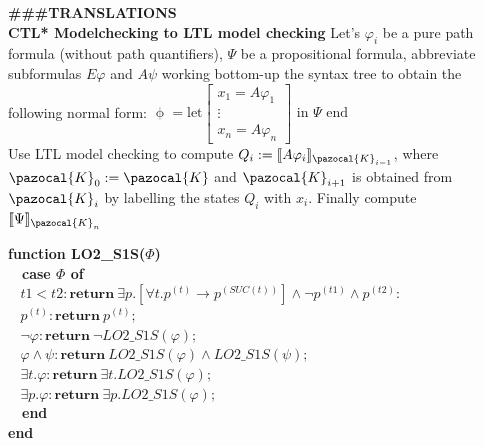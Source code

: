 \documentclass{article}
\newcommand{\Kb}{\pazocal{K}}
\begin{document}
\begin{multicols}{4}

\textbf{\#\#\#TRANSLATIONS} \\

\textbf{CTL* Modelchecking to LTL model checking}
Let's $\varphi_i$ be a pure path formula (without path quantifiers), $\Psi$ be a propositional formula, abbreviate subformulas $E\varphi$ and $A\psi$ working bottom-up the syntax tree to obtain the following normal form:
$\upphi = \text{let} \begin{bmatrix}
x_1 = A\varphi_1\\
\vdots \\
x_n = A\varphi_n
\end{bmatrix}
\text{ in } \Psi \text{ end}$\\
Use LTL model checking to compute $Q_i:=\llbracket A\varphi_i\rrbracket _{\Kb_{i-1}}$, where $\Kb_0 := \Kb$ and $\Kb_{i+1}$ is obtained from $\Kb_i$ by labelling the states $Q_i$ with $x_i$.
Finally compute $\llbracket \Psi \rrbracket_{\Kb_n}$

\textbf{function LO2\_S1S($\Phi$)} \\
\ \ \textbf{case $\Phi$ of} \\
$\ \ \ \ t1 < t2 : \textbf{return}\ \exists p. [\forall t. p^{(t)} \rightarrow p^{(SUC(t))} ] \wedge \neg p^{(t1)} \wedge p^{(t2)}:$ \\
$\ \ \ \ p^{(t)} : \textbf{return}\ p^{(t)}; $ \\
$\ \ \ \ \neg \varphi : \textbf{return}\ \neg LO2\_S1S(\varphi); $ \\
$\ \ \ \ \varphi \wedge \psi : \textbf{return}\ LO2\_S1S(\varphi) \wedge LO2\_S1S(\psi); $ \\
$\ \ \ \ \exists t.\varphi : \textbf{return}\ \exists t.LO2\_S1S(\varphi);$ \\
$\ \ \ \ \exists p.\varphi : \textbf{return}\ \exists p.LO2\_S1S(\varphi); $ \\
\ \ \textbf{end} \\
\textbf{end} \\


\end{multicols}
\end{document}
